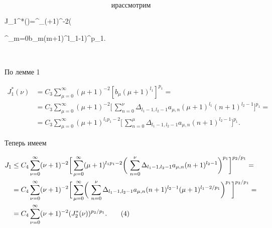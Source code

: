 $$ 


и рассмотрим 


$$ 


J_1^*(\nu)=\sum^\infty_{}(\mu+1)^{-2}\biggl(\, 


\sum^\mu_{m=0}b_m(m+1)^{l_1-1}\biggr)^{p_1}. 


$$ 


По лемме 1 


\begin{align*} 


J_1^*(\nu)&=C_3\sum^\infty_{\mu=0}(\mu+1)^{-2}[b_\mu(\mu+1)^{l_1}]^{p_1}=\\ 


% 


&=C_3\sum^\infty_{\mu=0}(\mu+1)^{-2}\biggl[\, 


\sum^\nu_{n=0}\Delta_{l_1-1,l_2-1}a_{\mu,n}(\mu+1)^{l_1} 


(n+1)^{l_2-1}\biggr]^{p_1}=\\ 


% 


&=C_3\sum^\infty_{\mu=0}(\mu+1)^{l_1p_1-2}\biggl[\, 


\sum^\mu_{n=0}\Delta_{l_1-1,l_2-1}a_{\mu,n}(n+1)^{l_2-1}\biggr]^{p_1}.


\end{align*} 


Теперь имеем 


\begin{align} 


J_1&\le C_4\sum^\infty_{\nu=0}(\nu+1)^{-2}\biggl[\, 


\sum^\infty_{\mu=0}(\mu+1)^{l_1p_1-2}\biggr(\, 


\sum^\nu_{n=0}\Delta_{l_1-1,l_2-1}a_{\mu,n}(n+1)^{l_2-1} 


\biggr)^{p_1}\biggr]^{p_2/p_1}=\notag \\ 


%


&=C_4\sum^\infty_{\nu=0}(\nu+1)^{-2}\biggl[\,


\sum^\infty_{\mu=0}\biggr(\, 


\sum^\nu_{n=0}\Delta_{l_1-1,l_2-1}a_{\mu,n}(n+1)^{l_2-1} 


(\mu+1)^{l_1-2/p_1}\biggr)^{p_1}\biggr]^{p_2/p_1}=\notag\\ 


% 


&=C_4\sum^\infty_{\nu=0}(\nu+1)^{-2} 


(J_2^*(\nu))^{p_2/p_1}.\tag{4} 


\end{align} 


